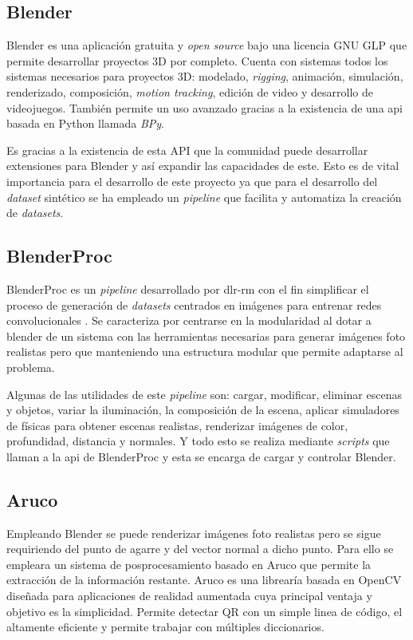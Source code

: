 \subsection{Blender}
\label{chap:Generación de un dataset subsec:Blender}
Blender es una aplicación gratuita y \textit{open source} bajo una licencia GNU GLP que permite desarrollar proyectos 3D por completo. Cuenta con sistemas todos los sistemas necesarios para proyectos 3D: modelado, \textit{rigging}, animación, simulación, renderizado, composición, \textit{motion tracking}, edición de video y desarrollo de videojuegos. También permite un uso avanzado gracias a la existencia de una \acs{api} basada en Python llamada \textit{BPy}.

Es gracias a la existencia de esta API que la comunidad puede desarrollar extensiones para Blender y así expandir las capacidades de este. Esto es de vital importancia para el desarrollo de este proyecto ya que para el desarrollo del \textit{dataset} sintético se ha empleado un \textit{pipeline} que facilita y automatiza la creación de \textit{datasets}. 

\subsection{BlenderProc}
\label{chap:Generación de un dataset subsec:BlenderProc}
BlenderProc es un \textit{pipeline} desarrollado por \ac{dlr-rm} con el fin simplificar el proceso de generación de \textit{datasets} centrados en imágenes para entrenar redes convolucionales \citep{denninger2019blenderproc}. Se caracteriza por centrarse en la modularidad al dotar a blender de un sistema con las herramientas necesarias para generar imágenes foto realistas pero que manteniendo una estructura modular que permite adaptarse al problema.

Algunas de las utilidades de este \textit{pipeline} son: cargar, modificar, eliminar escenas y objetos, variar la iluminación, la composición de la escena, aplicar simuladores de físicas para obtener escenas realistas, renderizar imágenes de color, profundidad, distancia y normales. Y todo esto se realiza mediante \textit{scripts} que llaman a la \acs{api} de BlenderProc y esta se encarga de cargar y controlar Blender.

\subsection{Aruco}
\label{chap:Generación de un dataset subsec:Aruco}
Empleando Blender se puede renderizar imágenes foto realistas pero se sigue requiriendo del punto de agarre y del vector normal a dicho punto. Para ello se empleara un sistema de posprocesamiento basado en Aruco \citep{ArUco} que permite la extracción de la información restante. Aruco es una librearía basada en OpenCV diseñada para aplicaciones de realidad aumentada cuya principal ventaja y objetivo es la simplicidad. Permite detectar QR con un simple linea de código, el altamente eficiente y permite trabajar con múltiples diccionarios.

